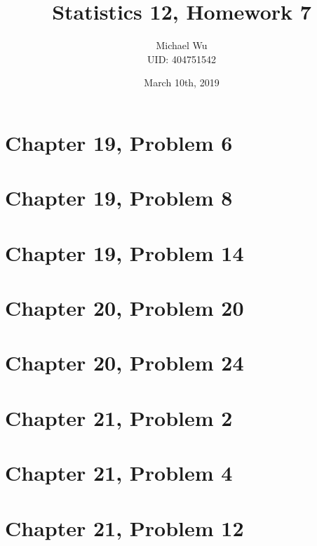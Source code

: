 \documentclass[12pt]{article}
\begin{document}
\title{Statistics 12, Homework 7}
\date{March 10th, 2019}
\author{Michael Wu\\UID: 404751542}
\maketitle

\section*{Chapter 19, Problem 6}

\section*{Chapter 19, Problem 8}

\section*{Chapter 19, Problem 14}

\section*{Chapter 20, Problem 20}

\section*{Chapter 20, Problem 24}

\section*{Chapter 21, Problem 2}

\section*{Chapter 21, Problem 4}

\section*{Chapter 21, Problem 12}
\end{document}
